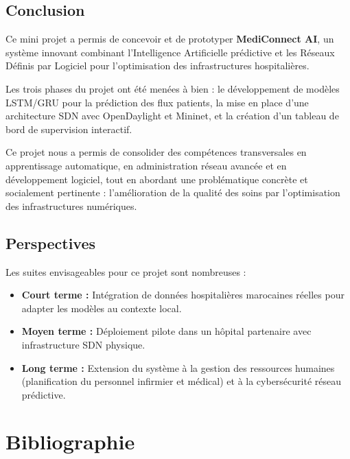 \documentclass[12pt,a4paper]{article}
\begin{document}
\subsection{Conclusion}

Ce mini projet a permis de concevoir et de prototyper \textbf{MediConnect AI}, un système innovant combinant l'Intelligence Artificielle prédictive et les Réseaux Définis par Logiciel pour l'optimisation des infrastructures hospitalières.

Les trois phases du projet ont été menées à bien : le développement de modèles LSTM/GRU pour la prédiction des flux patients, la mise en place d'une architecture SDN avec OpenDaylight et Mininet, et la création d'un tableau de bord de supervision interactif.

Ce projet nous a permis de consolider des compétences transversales en apprentissage automatique, en administration réseau avancée et en développement logiciel, tout en abordant une problématique concrète et socialement pertinente : l'amélioration de la qualité des soins par l'optimisation des infrastructures numériques.

\subsection{Perspectives}

Les suites envisageables pour ce projet sont nombreuses :

\begin{itemize}[leftmargin=1.5cm]
  \item \textbf{Court terme :} Intégration de données hospitalières marocaines réelles pour adapter les modèles au contexte local.
  \item \textbf{Moyen terme :} Déploiement pilote dans un hôpital partenaire avec infrastructure SDN physique.
  \item \textbf{Long terme :} Extension du système à la gestion des ressources humaines (planification du personnel infirmier et médical) et à la cybersécurité réseau prédictive.
\end{itemize}

\newpage
\section*{Bibliographie}
\end{document}

